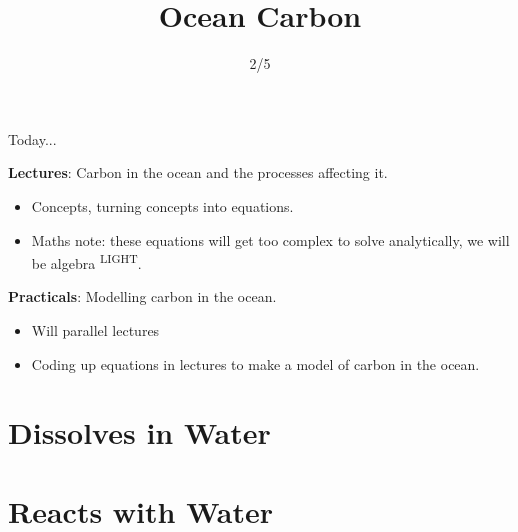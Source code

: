 

\title{Ocean Carbon}
\author{2/5}



\begin{frame}{Today...}

\textbf{Lectures}: Carbon in the ocean and the processes affecting it.

\begin{itemize}
    \item Concepts, turning concepts into equations. 
    \item Maths note: these equations will get too complex to solve analytically, we will be algebra \textsuperscript{LIGHT}.
\end{itemize}

\bigskip

\textbf{Practicals}: Modelling carbon in the ocean.

\begin{itemize}
    \item Will parallel lectures
    \item Coding up equations in lectures to make a model of carbon in the ocean.
\end{itemize}

\end{frame}

\section{ Dissolves in Water}


\section{ Reacts with Water}






